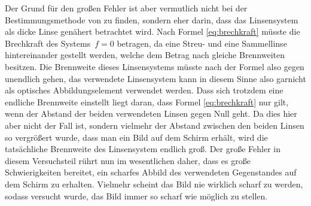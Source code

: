 Der Grund für den großen Fehler ist aber vermutlich nicht bei der
Bestimmungsmethode von  zu finden, sondern eher darin, dass
das Linsensystem als dicke Linse genähert betrachtet wird.  Nach Formel
\eqref{eq:brechkraft} müsste die Brechkraft des Systems~$f = 0$
betragen, da eine Streu- und eine Sammellinse hintereinander gestellt
werden, welche dem Betrag nach gleiche Brennweiten besitzen. Die
Brennweite dieses Linsensystems müsste nach der Formel also gegen
unendlich gehen, das verwendete Linsensystem kann in diesem Sinne also
garnicht als optisches Abbildungselement verwendet werden.  Dass sich
trotzdem eine endliche Brennweite einstellt liegt daran, dass Formel
\eqref{eq:brechkraft} nur gilt, wenn der Abstand der beiden verwendeten
Linsen gegen Null geht. Da dies hier aber nicht der Fall ist, sondern
vielmehr der Abstand zwischen den beiden Linsen so vergrößert wurde,
dass man ein Bild auf dem Schirm erhält, wird die tatsächliche
Brennweite des Linsensystem endlich groß.  Der große Fehler in diesem
Versuchsteil rührt nun im wesentlichen daher, dass es große
Schwierigkeiten bereitet, ein scharfes Abbild des verwendeten
Gegenstandes auf dem Schirm zu erhalten. Vielmehr scheint das Bild nie
wirklich scharf zu werden, sodass versucht wurde, das Bild immer so
scharf wie möglich zu stellen.
